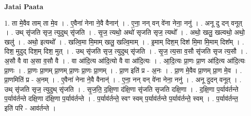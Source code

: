 \documentclass[17pt]{extarticle}
\begin{document}
\textbf{Jatai Paata} \newline

1. ता मे॒वैव ताम् ता मे॒व । . ए॒वैना॑ नेना ने॒वै वैनान्॑ । . ए॒ना॒ नन् वन् वे॑ना नेना॒ ननु॑ । . अनू दु दन् वनूत् । . उथ् सृ॑जति सृज॒ त्युदुथ् सृ॑जति । . सृ॒ज॒ त्यथो॒ अथो॑ सृजति सृज॒ त्यथो᳚ । . अथो॒ खलु॒ खल्वथो॒ अथो॒ खलु॑ । . अथो॒ इत्यथो᳚ । . खल्वि॒मा मि॒माम् खलु॒ खल्वि॒माम् । . इ॒माम् दिश॒म् दिश॑ मि॒मा मि॒माम् दिश᳚म् । . दिश॒ मुदुद् दिश॒म् दिश॒ मुत् । . उथ् सृ॑जति सृज॒ त्युदुथ् सृ॑जति । . सृ॒ज॒ त्य॒सा व॒सौ सृ॑जति सृज त्य॒सौ । . अ॒सौ वै वा अ॒सा व॒सौ वै । . वा आ॑दि॒त्य आ॑दि॒त्यो वै वा आ॑दि॒त्यः । . आ॒दि॒त्यः प्रा॒णः प्रा॒ण आ॑दि॒त्य आ॑दि॒त्यः प्रा॒णः । . प्रा॒णः प्रा॒णम् प्रा॒णम् प्रा॒णः प्रा॒णः प्रा॒णम् । . प्रा॒ण इति॑ प्र - अ॒नः । . प्रा॒ण मे॒वैव प्रा॒णम् प्रा॒ण मे॒व । . प्रा॒णमिति॑ प्र - अ॒नम् । . ए॒वैना॑ नेना ने॒वै वैनान्॑ । . ए॒ना॒ नन् वन् वे॑ना नेना॒ ननु॑ । . अनू दुदन् वनूत् । . उथ् सृ॑जति सृज॒ त्युदुथ् सृ॑जति । . सृ॒ज॒ति॒ द॒क्षि॒णा द॑क्षि॒णा सृ॑जति सृजति दक्षि॒णा । . द॒क्षि॒णा प॒र्याव॑र्तन्ते प॒र्याव॑र्तन्ते दक्षि॒णा द॑क्षि॒णा प॒र्याव॑र्तन्ते । . प॒र्याव॑र्तन्ते॒ स्वꣳ स्वम् प॒र्याव॑र्तन्ते प॒र्याव॑र्तन्ते॒ स्वम् । . प॒र्याव॑र्तन्त॒ इति॑ परि - आव॑र्तन्ते । \newline
\end{document}

